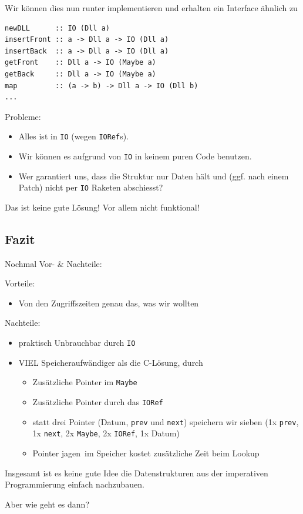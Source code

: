 \documentclass{beamer}
\begin{document}
\begin{frame}[fragile]
Wir können dies nun runter implementieren und erhalten ein Interface ähnlich zu

\begin{verbatim}
newDLL      :: IO (Dll a)
insertFront :: a -> Dll a -> IO (Dll a)
insertBack  :: a -> Dll a -> IO (Dll a)
getFront    :: Dll a -> IO (Maybe a)
getBack     :: Dll a -> IO (Maybe a)
map         :: (a -> b) -> Dll a -> IO (Dll b)
...
\end{verbatim}
\pause\bigskip

Probleme:
\begin{itemize}
 \item Alles ist in \texttt{IO} (wegen \texttt{IORef}s).
 \pause
 \item Wir können es aufgrund von \texttt{IO} in keinem puren Code benutzen.
 \pause
 \item Wer garantiert uns, dass die Struktur nur Daten hält und (ggf. nach einem \glqq Patch\grqq ) nicht per \texttt{IO} Raketen abschiesst?
\end{itemize}
\pause
Das ist keine gute Lösung! Vor allem nicht funktional!
\end{frame}

\subsection{Fazit}

\begin{frame}
Nochmal Vor- \& Nachteile:\pause\bigskip

Vorteile:
\begin{itemize}
 \item Von den Zugriffszeiten genau das, was wir wollten
\end{itemize}
\pause
Nachteile:
\begin{itemize}
 \item praktisch Unbrauchbar durch \texttt{IO}
 \pause
 \item VIEL Speicheraufwändiger als die C-Lösung, durch
 \pause
 \begin{itemize}
  \item Zusätzliche Pointer im \texttt{Maybe}
  \pause
  \item Zusätzliche Pointer durch das \texttt{IORef}
  \pause
  \item statt drei Pointer (Datum, \texttt{prev} und \texttt{next}) speichern wir sieben (1x \texttt{prev}, 1x \texttt{next}, 2x \texttt{Maybe}, 2x \texttt{IORef}, 1x Datum)
  \pause
  \item \glqq Pointer jagen\grqq \ im Speicher kostet zusätzliche Zeit beim Lookup
 \end{itemize}
\end{itemize}
\pause

Insgesamt ist es keine gute Idee die Datenstrukturen aus der imperativen Programmierung einfach nachzubauen. \\\par\pause
Aber wie geht es dann?
\end{frame}
\end{document}
